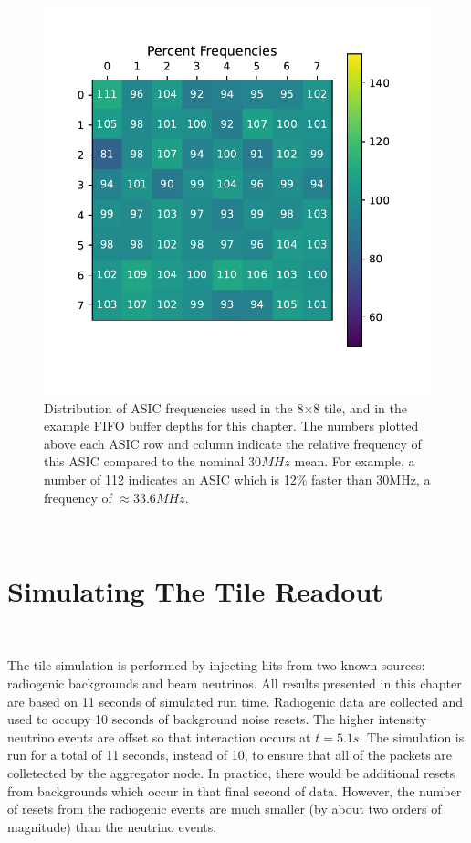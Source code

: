 \begin{figure}[]
\centering
\includegraphics[width=\textwidth]{images/asic_frequency.pdf}
\caption{Distribution of ASIC frequencies used in the 8$\times$8 tile, and in the example FIFO buffer depths for this chapter.
The numbers plotted above each ASIC row and column indicate the relative frequency of this ASIC compared to the nominal 30$\unit{MHz}$ mean.
For example, a number of 112 indicates an ASIC which is 12\% faster than 30MHz, a frequency of $\approx 33.6 MHz$.}
\end{figure}~\label{fig:asic_frequency_example}

\section{Simulating The Tile Readout}~\label{sec:simulating_tile}

The tile simulation is performed by injecting hits from two known sources: radiogenic backgrounds and beam neutrinos.
All results presented in this chapter are based on 11 seconds of simulated run time.
Radiogenic data are collected and used to occupy 10 seconds of background noise resets.
The higher intensity neutrino events are offset so that interaction occurs at $t = 5.1 s$.
The simulation is run for a total of 11 seconds, instead of 10, to ensure that all of the packets are colletected by the aggregator node.
In practice, there would be additional resets from backgrounds which occur in that final second of data.
However, the number of resets from the radiogenic events are much smaller (by about two orders of magnitude) than the neutrino events.


